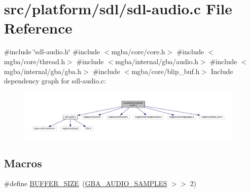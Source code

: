 \hypertarget{sdl-audio_8c}{}\section{src/platform/sdl/sdl-\/audio.c File Reference}
\label{sdl-audio_8c}
{\ttfamily \#include \char`\"{}sdl-\/audio.\+h\char`\"{}}\newline
{\ttfamily \#include $<$mgba/core/core.\+h$>$}\newline
{\ttfamily \#include $<$mgba/core/thread.\+h$>$}\newline
{\ttfamily \#include $<$mgba/internal/gba/audio.\+h$>$}\newline
{\ttfamily \#include $<$mgba/internal/gba/gba.\+h$>$}\newline
{\ttfamily \#include $<$mgba/core/blip\+\_\+buf.\+h$>$}\newline
Include dependency graph for sdl-\/audio.c\+:
\nopagebreak
\begin{figure}[H]
\begin{center}
\leavevmode
\includegraphics[width=350pt]{sdl-audio_8c__incl}
\end{center}
\end{figure}
\subsection*{Macros}
\begin{DoxyCompactItemize}
\item 
\#define \mbox{\hyperlink{sdl-audio_8c_a6b20d41d6252e9871430c242cb1a56e7}{B\+U\+F\+F\+E\+R\+\_\+\+S\+I\+ZE}}~(\mbox{\hyperlink{_2audio_8c_a422895065f1256e720e761567d0b443e}{G\+B\+A\+\_\+\+A\+U\+D\+I\+O\+\_\+\+S\+A\+M\+P\+L\+ES}} $>$$>$ 2)
\end{DoxyCompactItemize}
